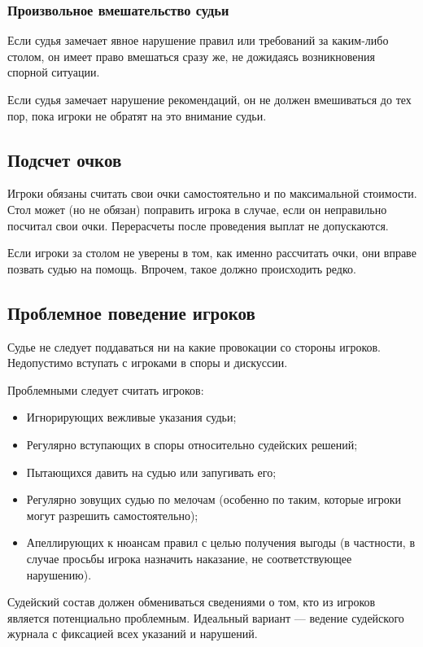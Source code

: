 \subsubsection{Произвольное вмешательство судьи}

Если судья замечает явное нарушение правил или требований за каким-либо столом, он имеет право вмешаться сразу же, не дожидаясь возникновения спорной ситуации.

Если судья замечает нарушение рекомендаций, он не должен вмешиваться до тех пор, пока игроки не обратят на это внимание судьи.

\subsection{Подсчет очков}

Игроки обязаны считать свои очки самостоятельно и по максимальной стоимости. Стол может (но не обязан) поправить игрока в случае, если он неправильно посчитал свои очки. Перерасчеты после проведения выплат не допускаются.

Если игроки за столом не уверены в том, как именно рассчитать очки, они вправе позвать судью на помощь. Впрочем, такое должно происходить редко.

\subsection{Проблемное поведение игроков}

Судье не следует поддаваться ни на какие провокации со стороны игроков. Недопустимо вступать с игроками в споры и дискуссии.

Проблемными следует считать игроков:
\begin{itemize}
	\item Игнорирующих вежливые указания судьи;
	\item Регулярно вступающих в споры относительно судейских решений;
	\item Пытающихся давить на судью или запугивать его;
	\item Регулярно зовущих судью по мелочам (особенно по таким, которые игроки могут разрешить самостоятельно);
	\item Апеллирующих к нюансам правил с целью получения выгоды (в частности, в случае просьбы игрока назначить наказание, не соответствующее нарушению).
\end{itemize}

Судейский состав должен обмениваться сведениями о том, кто из игроков является потенциально проблемным. Идеальный вариант --- ведение судейского журнала с фиксацией всех указаний и нарушений.

